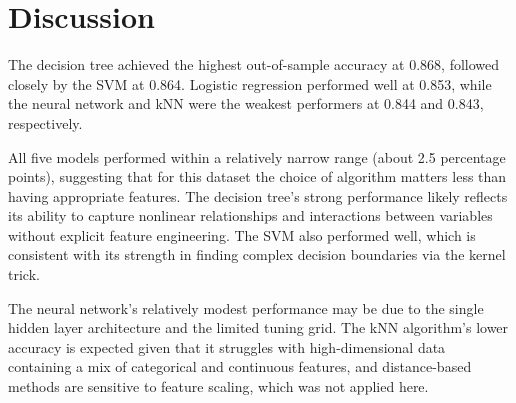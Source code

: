 \documentclass[12pt]{article}
\begin{document}
\section*{Discussion}

The decision tree achieved the highest out-of-sample accuracy at 0.868, followed closely by the SVM at 0.864. Logistic regression performed well at 0.853, while the neural network and kNN were the weakest performers at 0.844 and 0.843, respectively.

All five models performed within a relatively narrow range (about 2.5 percentage points), suggesting that for this dataset the choice of algorithm matters less than having appropriate features. The decision tree's strong performance likely reflects its ability to capture nonlinear relationships and interactions between variables without explicit feature engineering. The SVM also performed well, which is consistent with its strength in finding complex decision boundaries via the kernel trick.

The neural network's relatively modest performance may be due to the single hidden layer architecture and the limited tuning grid. The kNN algorithm's lower accuracy is expected given that it struggles with high-dimensional data containing a mix of categorical and continuous features, and distance-based methods are sensitive to feature scaling, which was not applied here.
\end{document}
